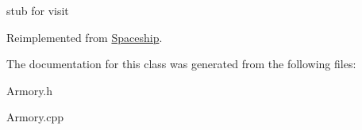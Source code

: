 stub for visit 

Reimplemented from \hyperlink{classSpaceship}{Spaceship}.



The documentation for this class was generated from the following files\+:\begin{DoxyCompactItemize}
\item 
Armory.\+h\item 
Armory.\+cpp\end{DoxyCompactItemize}
